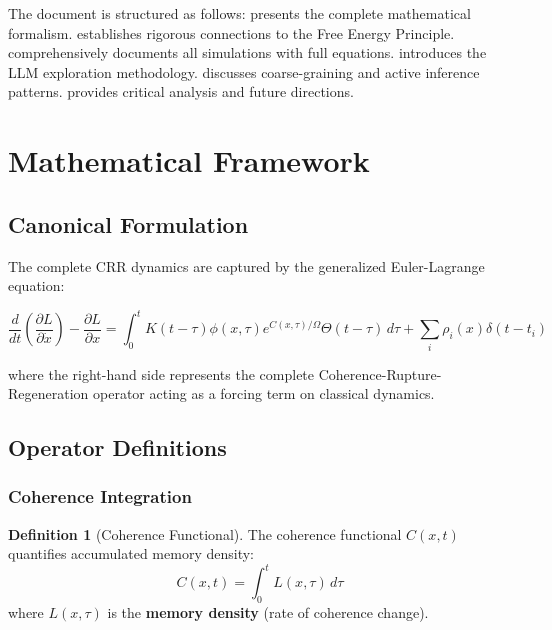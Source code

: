 \documentclass[11pt,a4paper]{article}
\theoremstyle{definition}
\newtheorem{definition}{Definition}[section]
\theoremstyle{remark}
\begin{document}
The document is structured as follows:  presents the complete mathematical formalism.  establishes rigorous connections to the Free Energy Principle.  comprehensively documents all simulations with full equations.  introduces the LLM exploration methodology.  discusses coarse-graining and active inference patterns.  provides critical analysis and future directions.

\section{Mathematical Framework}
\label{sec:mathematical-framework}

\subsection{Canonical Formulation}

The complete CRR dynamics are captured by the generalized Euler-Lagrange equation:

\begin{equation}
\frac{d}{dt}\left(\frac{\partial L}{\partial \dot{x}}\right) - \frac{\partial L}{\partial x} = \int_0^t K(t-\tau) \phi(x,\tau) e^{C(x,\tau)/\Omega} \Theta(t-\tau)\,d\tau + \sum_i \rho_i(x) \delta(t-t_i)
\label{eq:canonical-crr}
\end{equation}

where the right-hand side represents the complete Coherence-Rupture-Regeneration operator acting as a forcing term on classical dynamics.

\subsection{Operator Definitions}

\subsubsection{Coherence Integration}

\begin{definition}[Coherence Functional]
The coherence functional $C(x,t)$ quantifies accumulated memory density:
\begin{equation}
C(x,t) = \int_0^t L(x,\tau)\,d\tau
\label{eq:coherence}
\end{equation}
where $L(x,\tau)$ is the \textbf{memory density} (rate of coherence change).
\end{definition}
\end{document}
